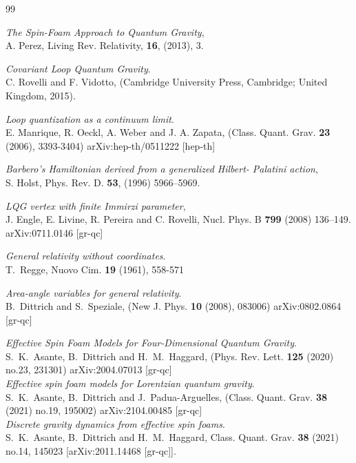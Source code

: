 \documentclass{article}
\begin{document}
 

\begin{thebibliography}{99}

\emph{The Spin-Foam Approach to Quantum Gravity},\\
A. Perez,
Living Rev. Relativity, {\bf 16}, (2013), 3.

\emph{Covariant Loop Quantum Gravity}.\\
C. Rovelli and F. Vidotto,
(Cambridge University Press, Cambridge; United Kingdom, 2015).

\emph{Loop quantization as a continuum limit}.\\
E. Manrique, R. Oeckl, A. Weber and J. A. Zapata,
(Class. Quant. Grav. \textbf{23} (2006), 3393-3404)
arXiv:hep-th/0511222 [hep-th]

\emph{Barbero’s Hamiltonian derived from a generalized Hilbert- Palatini action},\\
S. Holst,
Phys. Rev. D. {\bf 53}, (1996) 5966–5969.

\emph{LQG vertex with finite Immirzi parameter},\\
J. Engle, E. Livine, R. Pereira and C. Rovelli,
Nucl. Phys. B {\bf 799} (2008) 136–149.
arXiv:0711.0146 [gr-qc]


\emph{General relativity without coordinates}.\\
T.~Regge,
Nuovo Cim. \textbf{19} (1961), 558-571



\emph{Area-angle variables for general relativity}.\\
B.~Dittrich and S.~Speziale,
(New J. Phys. \textbf{10} (2008), 083006)
arXiv:0802.0864 [gr-qc]

\emph{Effective Spin Foam Models for Four-Dimensional Quantum Gravity}.\\
S.~K.~Asante, B.~Dittrich and H.~M.~Haggard,
(Phys. Rev. Lett. \textbf{125} (2020) no.23, 231301)
arXiv:2004.07013 [gr-qc]\\
\emph{Effective spin foam models for Lorentzian quantum gravity}.\\
S.~K.~Asante, B.~Dittrich and J.~Padua-Arguelles,
(Class. Quant. Grav. \textbf{38} (2021) no.19, 195002)
arXiv:2104.00485 [gr-qc]\\
\emph{Discrete gravity dynamics from effective spin foams}.\\
S.~K.~Asante, B.~Dittrich and H.~M.~Haggard,
Class. Quant. Grav. \textbf{38} (2021) no.14, 145023
[arXiv:2011.14468 [gr-qc]].\\



\end{thebibliography}
\end{document}
